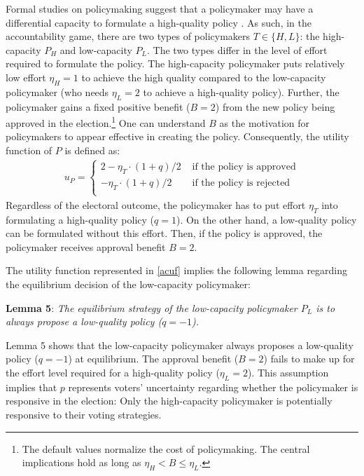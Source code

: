 \documentclass[letterpaper, 12pt]{article}
\begin{document}
    \par Formal studies on policymaking suggest that a policymaker may have a differential capacity to formulate a high-quality policy \cite[e.g.,][]{Gailmard2007slan, Huber2004buca}. As such, in the accountability game, there are two types of policymakers $T \in \{H, L\}$: the high-capacity $P_H$ and low-capacity $P_L$. The two types differ in the level of effort required to formulate the policy. The high-capacity policymaker puts relatively low effort $\eta_H = 1$ to achieve the high quality compared to the low-capacity policymaker (who needs $\eta_L = 2$ to achieve a high-quality policy). Further, the policymaker gains a fixed positive benefit ($B=2$) from the new policy being approved in the election.\footnote{The default values normalize the cost of policymaking. The central implications hold as long as $\eta_H < B \leq \eta_L$.} One can understand $B$ as the motivation for policymakers to appear effective in creating the policy. Consequently, the utility function of $P$ is defined as:
    \begin{align}
    u_P = \begin{cases}
    2 - \eta_T \cdot (1+q)/2 &\text{ if the policy is approved} \\
    - \eta_T \cdot (1+q)/2 &\text{ if the policy is rejected} \\
    \end{cases} \label{acuf}
    \end{align}
    \noindent Regardless of the electoral outcome, the policymaker has to put effort $\eta_T$ into formulating a high-quality policy ($q=1$). On the other hand, a low-quality policy can be formulated without this effort. Then, if the policy is approved, the policymaker receives approval benefit $B=2$. 
    
    \par The utility function represented in \autoref{acuf} implies the following lemma regarding the equilibrium decision of the low-capacity policymaker:
    
    \noindent \textbf{Lemma 5}: \textit{The equilibrium strategy of the low-capacity policymaker $P_L$ is to always propose a low-quality policy ($q=-1$).}
    
    \noindent Lemma 5 shows that the low-capacity policymaker always proposes a low-quality policy ($q=-1$) at equilibrium. The approval benefit ($B=2$) fails to make up for the effort level required for a high-quality policy ($\eta_L=2$). This assumption implies that $p$ represents voters' uncertainty regarding whether the policymaker is responsive in the election: Only the high-capacity policymaker is potentially responsive to their voting strategies. 
    
\end{document}
